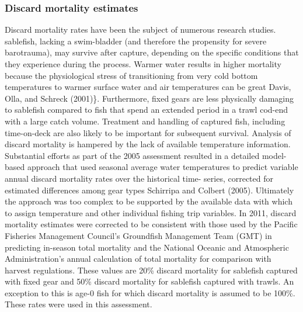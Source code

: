 \documentclass[11pt,
  english,
  a4paper,
]{article}
\begin{document}
\hypertarget{discard-mortality-estimates}{%
\subsubsection{Discard mortality estimates}\label{discard-mortality-estimates}}

\leavevmode\tagmcend\tagstructend


Discard mortality rates have been the subject of numerous research studies. sablefish, lacking a swim-bladder (and therefore the propensity for severe barotrauma), may survive after capture, depending on the specific conditions that they experience during the process. Warmer water results in higher mortality because the physiological stress of transitioning from very cold bottom temperatures to warmer surface water and air temperatures can be great {Davis, Olla, and Schreck (2001)\leavevmode\tagmcend\tagstructend}\}. Furthermore, fixed gears are less physically damaging to sablefish compared to fish that spend an extended period in a trawl cod-end with a large catch volume. Treatment and handling of captured fish, including time-on-deck are also likely to be important for subsequent survival. Analysis of discard mortality is hampered by the lack of available temperature information. Substantial efforts as part of the 2005 assessment resulted in a detailed model-based approach that used seasonal average water temperatures to predict variable annual discard mortality rates over the historical time- series, corrected for estimated differences among gear types {Schirripa and Colbert (2005)\leavevmode\tagmcend\tagstructend}. Ultimately the approach was too complex to be supported by the available data with which to assign temperature and other individual fishing trip variables. In 2011, discard mortality estimates were corrected to be consistent with those used by the Pacific Fisheries Management Council's Groundfish Management Team (GMT) in predicting in-season total mortality and the National Oceanic and Atmospheric Administration's annual calculation of total mortality for comparison with harvest regulations. These values are 20\% discard mortality for sablefish captured with fixed gear and 50\% discard mortality for sablefish captured with trawls. An exception to this is age-0 fish for which discard mortality is assumed to be 100\%. These rates were used in this assessment.
\end{document}
